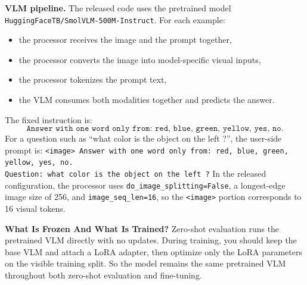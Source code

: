 \begin{Q}
\medskip
\noindent\textbf{VLM pipeline.}
The released code uses the pretrained model \texttt{HuggingFaceTB/SmolVLM-500M-Instruct}.
For each example:
\begin{itemize}
\item the processor receives the image and the prompt together,
\item the processor converts the image into model-specific visual inputs,
\item the processor tokenizes the prompt text,
\item the VLM consumes both modalities together and predicts the answer.
\end{itemize}
The fixed instruction is:
\[
\texttt{Answer with one word only from: red, blue, green, yellow, yes, no.}
\]
For a question such as ``what color is the object on the left ?'', the user-side prompt is:
{\small
\texttt{<image> Answer with one word only from: red, blue, green, yellow, yes, no.}\\
\texttt{Question: what color is the object on the left ?}
}
In the released configuration, the processor uses \texttt{do\_image\_splitting=False}, a longest-edge image size of 256, and \texttt{image\_seq\_len=16}, so the \texttt{<image>} portion corresponds to 16 visual tokens.

\medskip
\noindent\textbf{What Is Frozen And What Is Trained?}
Zero-shot evaluation runs the pretrained VLM directly with no updates.
During training, you should keep the base VLM and attach a LoRA adapter, then optimize only the LoRA parameters on the visible training split.
So the model remains the same pretrained VLM throughout both zero-shot evaluation and fine-tuning.

\begin{center}


\end{center}
\end{Q}
